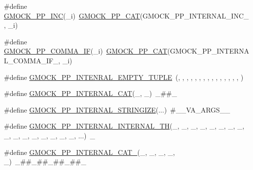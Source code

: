 \begin{DoxyCompactItemize}
\item 
\#define \mbox{\hyperlink{_obj__test_2lib_2googletest-master_2googlemock_2include_2gmock_2internal_2gmock-pp_8h_abcffb7b948f0eed30aa35ba3c1e77299}{G\+M\+O\+C\+K\+\_\+\+P\+P\+\_\+\+I\+NC}}(\+\_\+i)~\mbox{\hyperlink{_obj__test_2lib_2googletest-master_2googlemock_2include_2gmock_2internal_2gmock-pp_8h_a108c52ffa81ab99348d23b8fa76fded3}{G\+M\+O\+C\+K\+\_\+\+P\+P\+\_\+\+C\+AT}}(G\+M\+O\+C\+K\+\_\+\+P\+P\+\_\+\+I\+N\+T\+E\+R\+N\+A\+L\+\_\+\+I\+N\+C\+\_\+, \+\_\+i)
\item 
\#define \mbox{\hyperlink{_obj__test_2lib_2googletest-master_2googlemock_2include_2gmock_2internal_2gmock-pp_8h_acad3f789b483c40204f25a56c3342103}{G\+M\+O\+C\+K\+\_\+\+P\+P\+\_\+\+C\+O\+M\+M\+A\+\_\+\+IF}}(\+\_\+i)~\mbox{\hyperlink{_obj__test_2lib_2googletest-master_2googlemock_2include_2gmock_2internal_2gmock-pp_8h_a108c52ffa81ab99348d23b8fa76fded3}{G\+M\+O\+C\+K\+\_\+\+P\+P\+\_\+\+C\+AT}}(G\+M\+O\+C\+K\+\_\+\+P\+P\+\_\+\+I\+N\+T\+E\+R\+N\+A\+L\+\_\+\+C\+O\+M\+M\+A\+\_\+\+I\+F\+\_\+, \+\_\+i)
\item 
\#define \mbox{\hyperlink{_obj__test_2lib_2googletest-master_2googlemock_2include_2gmock_2internal_2gmock-pp_8h_a7a4a2a8606d20424b0ec1db4236819e4}{G\+M\+O\+C\+K\+\_\+\+P\+P\+\_\+\+I\+N\+T\+E\+N\+R\+A\+L\+\_\+\+E\+M\+P\+T\+Y\+\_\+\+T\+U\+P\+LE}}~(, , , , , , , , , , , , , , , )
\item 
\#define \mbox{\hyperlink{_obj__test_2lib_2googletest-master_2googlemock_2include_2gmock_2internal_2gmock-pp_8h_a2b034c776c832e3d951f5d123658a7ba}{G\+M\+O\+C\+K\+\_\+\+P\+P\+\_\+\+I\+N\+T\+E\+R\+N\+A\+L\+\_\+\+C\+AT}}(\+\_,  \+\_)~\+\_\#\#\+\_
\item 
\#define \mbox{\hyperlink{_obj__test_2lib_2googletest-master_2googlemock_2include_2gmock_2internal_2gmock-pp_8h_afd092b75707cbc1efd7fe183c94afb79}{G\+M\+O\+C\+K\+\_\+\+P\+P\+\_\+\+I\+N\+T\+E\+R\+N\+A\+L\+\_\+\+S\+T\+R\+I\+N\+G\+I\+ZE}}(...)~\#\+\_\+\+\_\+\+V\+A\+\_\+\+A\+R\+G\+S\+\_\+\+\_\+
\item 
\#define \mbox{\hyperlink{_obj__test_2lib_2googletest-master_2googlemock_2include_2gmock_2internal_2gmock-pp_8h_ac3815de01d162a72578830f0ffbfbeb3}{G\+M\+O\+C\+K\+\_\+\+P\+P\+\_\+\+I\+N\+T\+E\+R\+N\+A\+L\+\_\+\+I\+N\+T\+E\+R\+N\+A\+L\+\_\+TH}}(\+\_,  \+\_,  \+\_,  \+\_,  \+\_,  \+\_,  \+\_,  \+\_,  \+\_,  \+\_,  \+\_,  \+\_,  \+\_,  \+\_,  \+\_,  \+\_,  ...)~\+\_
\item 
\#define \mbox{\hyperlink{_obj__test_2lib_2googletest-master_2googlemock_2include_2gmock_2internal_2gmock-pp_8h_a11241887f4be09cdb6a57bb841620581}{G\+M\+O\+C\+K\+\_\+\+P\+P\+\_\+\+I\+N\+T\+E\+R\+N\+A\+L\+\_\+\+C\+A\+T\+\_}}(\+\_,  \+\_,  \+\_,  \+\_,  \+\_)~\+\_\#\#\+\_\#\#\+\_\#\#\+\_\#\#\+\_

\end{DoxyCompactItemize}
